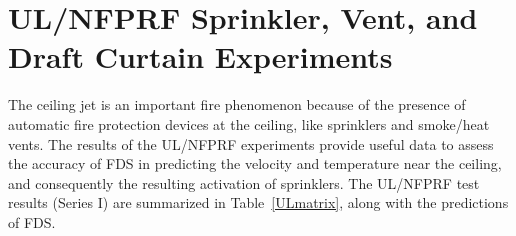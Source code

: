 \clearpage

\section{UL/NFPRF Sprinkler, Vent, and Draft Curtain Experiments}
\label{UL_NFPRF:Results}

The ceiling jet is an important fire phenomenon because of the presence of automatic fire protection devices at the ceiling, like
sprinklers and smoke/heat vents. The results of the UL/NFPRF experiments provide useful data to assess the accuracy of FDS in predicting
the velocity and temperature near the ceiling, and consequently the resulting activation of sprinklers.
The UL/NFPRF test results (Series I) are summarized in Table~\ref{ULmatrix}, along with the predictions of FDS.

